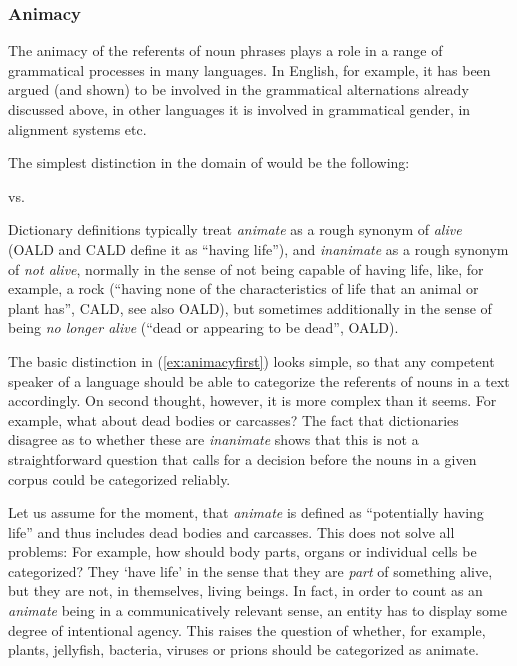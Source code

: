 \subsubsection{Animacy}
\label{sec:operationalizinganimacy}

The animacy of the referents of noun phrases plays a role in a range of grammatical processes in many languages. In English, for example, it has been argued (and shown) to be involved in the grammatical alternations already discussed above, in other languages it is involved in grammatical gender, in alignment systems etc. 

The simplest distinction in the domain of  would be the following:

\begin{exe}
\ex {} vs. 
\label{ex:animacyfirst}
\end{exe}

Dictionary definitions typically treat \textit{animate} as a rough synonym of \textit{alive} (OALD and CALD define it as ``having life''), and \textit{inanimate} as a rough synonym of \textit{not alive}, normally in the sense of not being capable of having life, like, for example, a rock (``having none of the characteristics of life that an animal or plant has'', CALD, see also OALD), but sometimes additionally in the sense of being \textit{no longer alive} (``dead or appearing to be dead'', OALD).

The basic distinction in (\ref{ex:animacyfirst}) looks simple, so that any competent speaker of a language should be able to categorize the referents of nouns in a text accordingly. On second thought, however, it is more complex than it seems. For example, what about dead bodies or carcasses? The fact that dictionaries disagree as to whether these are \textit{inanimate} shows that this is not a straightforward question that calls for a decision before the nouns in a given corpus could be categorized reliably.

Let us assume for the moment, that \textit{animate} is defined as ``potentially having life'' and thus includes dead bodies and carcasses. This does not solve all problems: For example, how should body parts, organs or individual cells be categorized? They `have life' in the sense that they are \textit{part} of something alive, but they are not, in themselves, living beings. In fact, in order to count as an \textit{animate} being in a communicatively relevant sense, an entity has to display some degree of intentional agency. This raises the question of whether, for example, plants, jellyfish, bacteria, viruses or prions should be categorized as animate.

